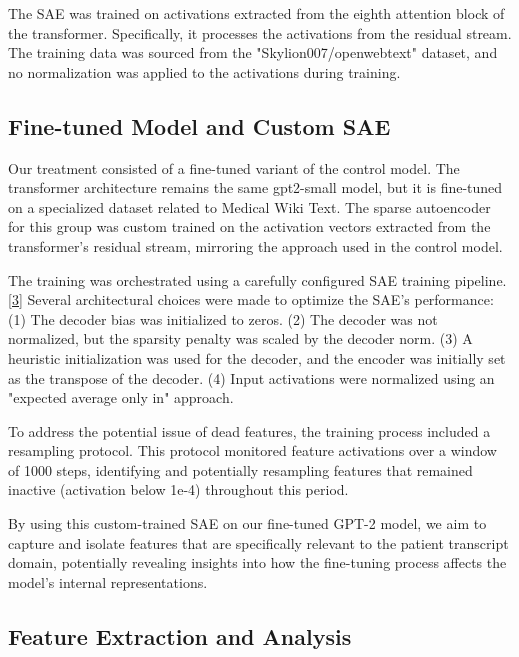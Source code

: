 The SAE was trained on activations extracted from the eighth attention block of the transformer. Specifically, it processes the activations from the residual stream. The training data was sourced from the "Skylion007/openwebtext" dataset, and no normalization was applied to the activations during training.

\subsection{Fine-tuned Model and Custom SAE}

Our treatment consisted of a fine-tuned variant of the control model. The transformer architecture remains the same gpt2-small model, but it is fine-tuned on a specialized dataset related to Medical Wiki Text. The sparse autoencoder for this group was custom trained on the activation vectors extracted from the transformer's residual stream, mirroring the approach used in the control model. 

The training was orchestrated using a carefully configured SAE training pipeline.\hyperlink{sae-training}{[3]} Several architectural choices were made to optimize the SAE's performance: (1) The decoder bias was initialized to zeros. (2) The decoder was not normalized, but the sparsity penalty was scaled by the decoder norm. (3) A heuristic initialization was used for the decoder, and the encoder was initially set as the transpose of the decoder. (4) Input activations were normalized using an "expected average only in" approach.


To address the potential issue of dead features, the training process included a resampling protocol. This protocol monitored feature activations over a window of 1000 steps, identifying and potentially resampling features that remained inactive (activation below 1e-4) throughout this period.

By using this custom-trained SAE on our fine-tuned GPT-2 model, we aim to capture and isolate features that are specifically relevant to the patient transcript domain, potentially revealing insights into how the fine-tuning process affects the model's internal representations.

\subsection{Feature Extraction and Analysis}

